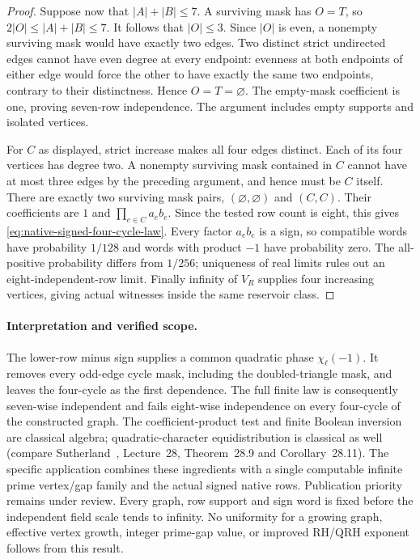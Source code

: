 \documentclass[11pt]{article}
\begin{document}
\begin{proof}
Suppose now that \(|A|+|B|\leq7\).
A surviving mask has \(O=T\), so
\(2|O|\leq |A|+|B|\leq7\).
It follows that \(|O|\leq3\).
Since \(|O|\) is even, a nonempty surviving mask would have exactly two
edges. Two distinct strict undirected edges cannot have even degree at
every endpoint: evenness at both endpoints of either edge would force
the other to have exactly the same two endpoints, contrary to their
distinctness. Hence \(O=T=\varnothing\).
The empty-mask coefficient is one, proving seven-row independence.
The argument includes empty supports and isolated vertices.

For \(C\) as displayed, strict increase makes all four edges distinct.
Each of its four vertices has degree two.
A nonempty surviving mask contained in \(C\) cannot have at most three
edges by the preceding argument, and hence must be \(C\) itself.
There are exactly two surviving mask pairs,
\((\varnothing,\varnothing)\) and \((C,C)\).
Their coefficients are \(1\) and \(\prod_{e\in C}a_eb_e\).
Since the tested row count is eight, this gives
\eqref{eq:native-signed-four-cycle-law}.
Every factor \(a_eb_e\) is a sign, so compatible words have probability
\(1/128\) and words with product \(-1\) have probability zero.
The all-positive probability differs from \(1/256\);
uniqueness of real limits rules out an eight-independent-row limit.
Finally infinity of \(V_R\) supplies four increasing vertices, giving
actual witnesses inside the same reservoir class.
\end{proof}

\paragraph{Interpretation and verified scope.}
The lower-row minus sign supplies a common quadratic phase
\(\chi_\ell(-1)\). It removes every odd-edge cycle mask, including the
doubled-triangle mask, and leaves the four-cycle as the first dependence.
The full finite law is consequently seven-wise independent and fails
eight-wise independence on every four-cycle of the constructed graph.
The coefficient-product test and finite Boolean inversion are classical
algebra; quadratic-character equidistribution is classical as well
(compare Sutherland~\cite{Sutherland}, Lecture~28,
Theorem~28.9 and Corollary~28.11).
The specific application combines these ingredients with a single
computable infinite prime vertex/gap family and the actual signed native
rows. Publication priority remains under review.
Every graph, row support and sign word is fixed before the independent
field scale tends to infinity. No uniformity for a growing graph,
effective vertex growth, integer prime-gap value, or improved RH/QRH
exponent follows from this result.
\end{document}
